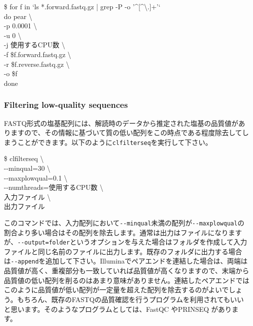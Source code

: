 \documentclass[titlepage,10pt,a4paper,english]{jsbook}
\newenvironment{cmd}{\begin{oframed}\raggedright\ttfamily\footnotesize\setlength{\baselineskip}{1.4em}}{\end{oframed}\vspace{-1em}}
\begin{document}
\begin{cmd}
\$ for f in `ls *.forward.fastq.gz | grep -P -o '{\textasciicircum}[{\textasciicircum}{\textbackslash}.]+'`\\
do pear {\textbackslash}\\
-p 0.0001 {\textbackslash}\\
-u 0 {\textbackslash}\\
-j 使用するCPU数 {\textbackslash}\\
-f \$f.forward.fastq.gz {\textbackslash}\\
-r \$f.reverse.fastq.gz {\textbackslash}\\
-o \$f\\
done
\end{cmd}

\subsubsection{Filtering low-quality sequences}

FASTQ形式の塩基配列には、解読時のデータから推定された塩基の品質値がありますので、その情報に基づいて質の低い配列をこの時点である程度除去してしまうことができます。以下のように\texttt{clfilterseq}を実行して下さい。

\begin{cmd}
\$ clfilterseq {\textbackslash}\\
{-}{-}minqual=30 {\textbackslash}\\
{-}{-}maxplowqual=0.1 {\textbackslash}\\
{-}{-}numthreads=使用するCPU数 {\textbackslash}\\
入力ファイル {\textbackslash}\\
出力ファイル
\end{cmd}

このコマンドでは、入力配列において\texttt{{-}{-}minqual}未満の配列が\texttt{{-}{-}maxplowqual}の割合より多い場合はその配列を除去します。通常は出力はファイルになりますが、\texttt{{-}{-}output=folder}というオプションを与えた場合はフォルダを作成して入力ファイルと同じ名前のファイルに出力します。既存のフォルダに出力する場合は\texttt{{-}{-}append}を追加して下さい。Illuminaでペアエンドを連結した場合は、両端は品質値が高く、重複部分も一致していれば品質値が高くなりますので、末端から品質値の低い配列を削るのはあまり意味がありません。連結したペアエンドではこのように品質値が低い配列が一定量を超えた配列を除去するのがよいでしょう。もちろん、既存のFASTQの品質確認を行うプログラムを利用されてもいいと思います。そのようなプログラムとしては、FastQC \citep{Andrews2010}やPRINSEQ \citep{Schmieder2011}があります。
\end{document}
